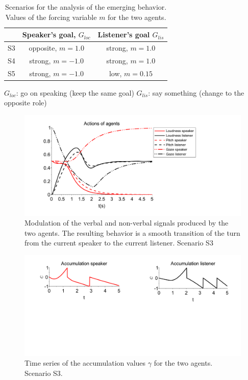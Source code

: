 \documentclass[twocolumn]{svjour3}
\begin{document}
\begin{table}
  \begin{center}
    \begin{tabular}{ccc}
      \hline
      \mbox{} & Speaker's goal, $G_{loc}$ & Listener's goal $G_{lis}$\\
      \hline
      S3 & opposite, $m=1.0$ & strong, $m=1.0$\\
      \hline
      S4 & strong, $m=-1.0$ & strong, $m=1.0$\\
      \hline
      S5 & strong, $m=-1.0$ & low, $m=0.15$\\
      \hline
    \end{tabular}
  \end{center}
  $G_{loc}$: go on speaking (keep the same goal)\linebreak
  $G_{lis}$: say something (change to the opposite role)

  \caption{Scenarios for the analysis of the emerging behavior. Values of the forcing variable $m$ for the two agents.}
  \label{tab_scenarios_emergence}
\end{table}

\begin{figure}[b]
  \centering
  \includegraphics[width=\linewidth]{figure/smooth-transition_signal-production.pdf}
  \caption{Modulation of the verbal and non-verbal signals produced by the two agents. The resulting behavior is a smooth transition of the turn from the current speaker to the current listener. Scenario S3} 
  \label{simu_smooth}
\end{figure}

\begin{figure}[t]
  \centering
  \includegraphics[width=\linewidth]{figure/smooth-transition_accumulation_small.pdf}
  \caption{Time series of the accumulation values $\gamma$ for the two agents. Scenario S3.}
  \label{smooth_acc}
\end{figure}
\end{document}
